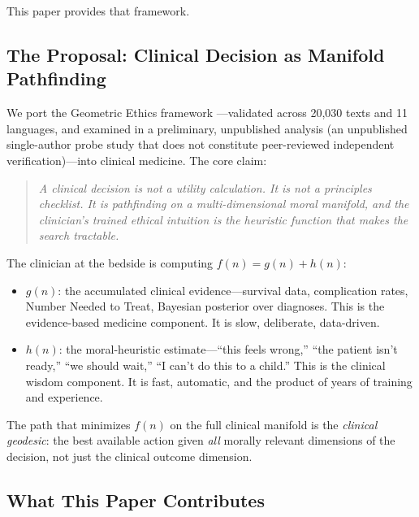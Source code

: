 \documentclass[12pt]{article}
\theoremstyle{definition}
\theoremstyle{remark}
\begin{document}
This paper provides that framework.

\subsection{The Proposal: Clinical Decision as Manifold Pathfinding}

We port the Geometric Ethics framework \cite{bond2026geometric}---validated across 20,030 texts and 11 languages, and examined in a preliminary, unpublished analysis \cite{thiele2026} (an unpublished single-author probe study that does not constitute peer-reviewed independent verification)---into clinical medicine.  The core claim:

\begin{quote}
\emph{A clinical decision is not a utility calculation.  It is not a principles checklist.  It is pathfinding on a multi-dimensional moral manifold, and the clinician's trained ethical intuition is the heuristic function that makes the search tractable.}
\end{quote}

The clinician at the bedside is computing $f(n) = g(n) + h(n)$:
\begin{itemize}
    \item $g(n)$: the accumulated clinical evidence---survival data, complication rates, Number Needed to Treat, Bayesian posterior over diagnoses.  This is the evidence-based medicine component.  It is slow, deliberate, data-driven.
    \item $h(n)$: the moral-heuristic estimate---``this feels wrong,'' ``the patient isn't ready,'' ``we should wait,'' ``I can't do this to a child.''  This is the clinical wisdom component.  It is fast, automatic, and the product of years of training and experience.
\end{itemize}

The path that minimizes $f(n)$ on the full clinical manifold is the \emph{clinical geodesic}: the best available action given \emph{all} morally relevant dimensions of the decision, not just the clinical outcome dimension.

\subsection{What This Paper Contributes}
\end{document}
